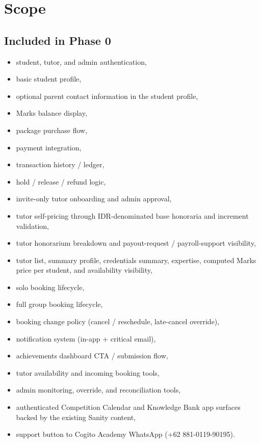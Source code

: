 \documentclass[11pt,a4paper]{article}
\begin{document}
\section{Scope}

\subsection{Included in Phase 0}
\begin{itemize}
	\item student, tutor, and admin authentication,
	\item basic student profile,
	\item optional parent contact information in the student profile,
	\item Marks balance display,
	\item package purchase flow,
	\item payment integration,
	\item transaction history / ledger,
	\item hold / release / refund logic,
	\item invite-only tutor onboarding and admin approval,
	\item tutor self-pricing through IDR-denominated base honoraria and increment validation,
	\item tutor honorarium breakdown and payout-request / payroll-support visibility,
	\item tutor list, summary profile, credentials summary, expertise, computed Marks price per student, and availability visibility,
	\item solo booking lifecycle,
	\item full group booking lifecycle,
	\item booking change policy (cancel / reschedule, late-cancel override),
	\item notification system (in-app + critical email),
	\item achievements dashboard CTA / submission flow,
	\item tutor availability and incoming booking tools,
	\item admin monitoring, override, and reconciliation tools,
\item authenticated Competition Calendar and Knowledge Bank app surfaces backed by the existing Sanity content,
	\item support button to Cogito Academy WhatsApp (+62 881-0119-90195).
\end{itemize}
\end{document}

